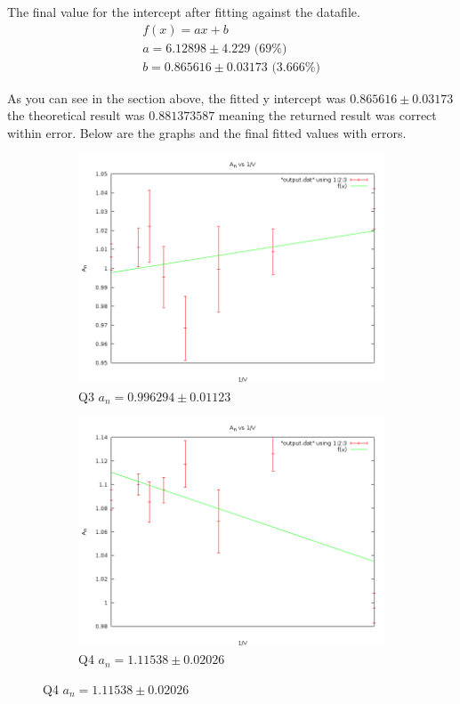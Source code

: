 \documentclass[10pt,a4paper]{article}
\begin{document}
The final value for the intercept after fitting against the datafile.
\begin{equation}
\begin{split}
f(x) = a x + b \\
a = 6.12898 \pm 4.229 \textrm{ (69\%)}\\
b = 0.865616 \pm 0.03173     \textrm{ (3.666\%)}
\end{split}
\end{equation}

As you can see in the section above, the fitted y intercept was $0.865616 \pm 0.03173$ the theoretical result was $0.881373587$ meaning the returned result was correct within error.
Below are the graphs and the final fitted values with errors.

\begin{figure}
\centering
\begin{subfigure}[b]{0.45\textwidth}
    \includegraphics[width=\textwidth]{q3variousgrid.png}
    \caption{Q3 $a_n = 0.996294 \pm 0.01123$}
\end{subfigure}
\begin{subfigure}[b]{0.45\textwidth}
    \includegraphics[width=\textwidth]{q4variousgrid.png}
    \caption{Q4 $a_n = 1.11538 \pm 0.02026$}
\end{subfigure}


\end{figure}
\end{document}
